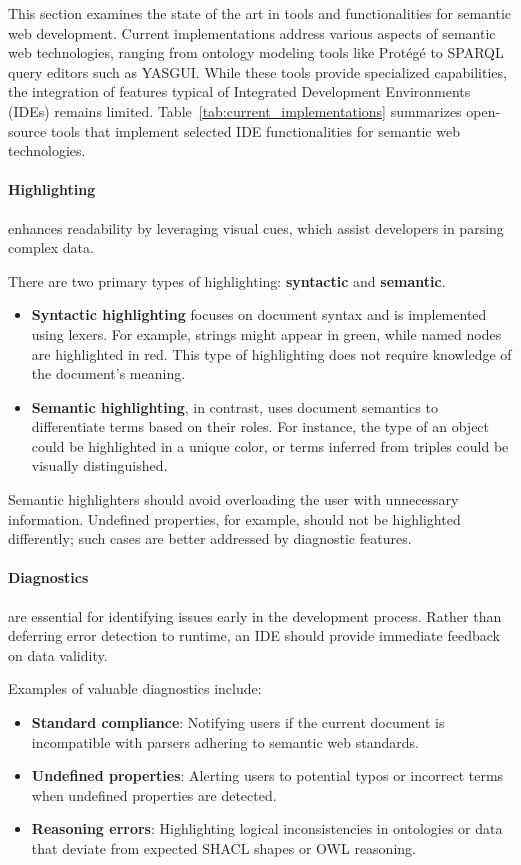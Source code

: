 This section examines the state of the art in tools and functionalities for semantic web development. 
Current implementations address various aspects of semantic web technologies, ranging from ontology modeling tools like Protégé to SPARQL query editors such as YASGUI.
While these tools provide specialized capabilities, the integration of features typical of Integrated Development Environments (IDEs) remains limited. 
Table~\ref{tab:current_implementations} summarizes open-source tools that implement selected IDE functionalities for semantic web technologies.

\paragraph*{Highlighting} enhances readability by leveraging visual cues, which assist developers in parsing complex data. 

There are two primary types of highlighting: \textbf{syntactic} and \textbf{semantic}.
\begin{itemize}
    \item \textbf{Syntactic highlighting} focuses on document syntax and is implemented using lexers. For example, strings might appear in green, while named nodes are highlighted in red. This type of highlighting does not require knowledge of the document’s meaning.
    \item \textbf{Semantic highlighting}, in contrast, uses document semantics to differentiate terms based on their roles. For instance, the type of an object could be highlighted in a unique color, or terms inferred from triples could be visually distinguished.
\end{itemize}
Semantic highlighters should avoid overloading the user with unnecessary information. Undefined properties, for example, should not be highlighted differently; such cases are better addressed by diagnostic features.


\paragraph*{Diagnostics} are essential for identifying issues early in the development process. 
Rather than deferring error detection to runtime, an IDE should provide immediate feedback on data validity.

Examples of valuable diagnostics include:
\begin{itemize}
    \item \textbf{Standard compliance}: Notifying users if the current document is incompatible with parsers adhering to semantic web standards.
    \item \textbf{Undefined properties}: Alerting users to potential typos or incorrect terms when undefined properties are detected.
    \item \textbf{Reasoning errors}: Highlighting logical inconsistencies in ontologies or data that deviate from expected SHACL shapes or OWL reasoning.
\end{itemize}

